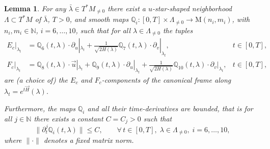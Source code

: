 \documentclass[10pt,a4paper]{amsart}
\newtheorem{lemma}{Lemma}
\newcommand{\N}{\mathbb{N}} %
\newcommand{\Q}{\mathbb{Q}}
\begin{document}
\begin{lemma}\label{l:lemmaEcFc}
For any $\bar{\lambda}\in T^*M_{\neq 0}$ there exist a $u$-star-shaped neighborhood $\Lambda \subset T^*M$ of $\bar{\lambda}$, $T>0$, and smooth maps $\Q_i: [0,T]\times  \Lambda_{\neq 0} \to \mathrm{M}(n_i,m_i)$, with $n_i,m_i\in \N$, $i=6,\dots,10$, such that for all $\lambda \in \Lambda_{\neq 0}$ the tuples
\begin{align}
E_c|_{\lambda_t} & = \Q_6(t,\lambda) \cdot \partial_u|_{\lambda_t}  + \frac{1}{\sqrt{2H(\lambda)}}\Q_7(t,\lambda)\cdot \partial_v|_{\lambda_t} , & t\in [0,T],\\
F_c|_{\lambda_t} & =  \Q_8(t,\lambda) \cdot \vec{u}|_{\lambda_t}  + \Q_9(t,\lambda) \cdot \partial_u|_{\lambda_t}  + \frac{1}{\sqrt{2H(\lambda)}}\Q_{10}(t,\lambda)\cdot \partial_v|_{\lambda_t} , & t\in [0,T],
\end{align}
are (a choice of) the $E_c$ and $F_c$-components of the canonical frame along $\lambda_t = e^{t\vec{H}}(\lambda)$.

Furthermore, the maps $\Q_i$ and all their time-derivatives are bounded, that is for all $j\in \N$ there exists a constant $C = C_j>0$ such that
\begin{equation}
\|\partial_t^{j}\Q_i(t,\lambda)\| \leq C ,\qquad \forall\, t \in [0,T],\; \lambda \in \Lambda_{\neq 0},\; i=6,\dots,10,
\end{equation}
where $\|\cdot\|$ denotes a fixed matrix norm.
\end{lemma}
\end{document}
